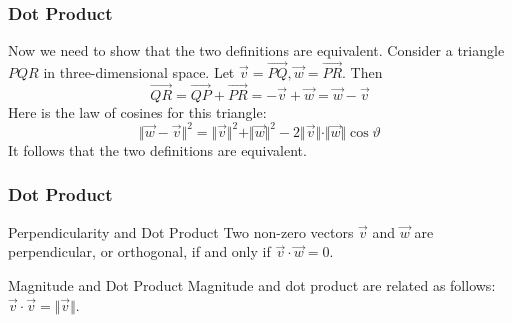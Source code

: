 \documentclass[xcolor=dvipsnames]{beamer}
\newcounter{exercise}
\newcommand{\ubung}[0]{\refstepcounter{exercise}\textbf{Exercise \arabic{exercise}: }}
\begin{document}
\begin{frame}
  \frametitle{Dot Product}
  Now we need to show that the two definitions are equivalent.
  Consider a triangle $PQR$ in three-dimensional space. Let
  $\vec{v}=\vec{PQ},\vec{w}=\vec{PR}$. Then
  \begin{equation}
    \label{eq:oobeipho}
  \vec{QR}=\vec{QP}+\vec{PR}=-\vec{v}+\vec{w}=\vec{w}-\vec{v}  
\end{equation}
Here is the law of cosines for this triangle:
\begin{equation}
  \label{eq:aiwahzoa}
  \Vert\vec{w}-\vec{v}\Vert^{2}=\Vert\vec{v}\Vert^{2}+\Vert\vec{w}\Vert^{2}-2\Vert\vec{v}\Vert\cdot\Vert\vec{w}\Vert\cos\vartheta
\end{equation}
It follows that the two definitions are equivalent.
\end{frame}

\begin{frame}
  \frametitle{Dot Product}
\begin{block}{Perpendicularity and Dot Product}
  Two non-zero vectors $\vec{v}$ and $\vec{w}$ are perpendicular, or
  orthogonal, if and only if $\vec{v}\cdot\vec{w}=0$.
\end{block}

\bigskip

\begin{block}{Magnitude and Dot Product}
  Magnitude and dot product are related as follows: $\vec{v}\cdot\vec{v}=\Vert\vec{v}\Vert$.
\end{block}
\end{frame}

\end{document}
